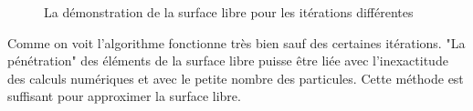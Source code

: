 \documentclass{article}
\begin{document}
\begin{figure}[H]
\begin{minipage}[h]{0.32\linewidth}
    \end{minipage}
    \hfill
    \begin{minipage}[h]{0.32\linewidth}
    \end{minipage}
    \caption{La démonstration de la surface libre pour les itérations différentes}
\end{figure}
    
Comme on voit l'algorithme fonctionne très bien sauf des certaines itérations. "La pénétration" des éléments de la surface libre puisse être liée avec l'inexactitude des calculs numériques et avec le petite nombre des particules. Cette méthode est suffisant pour approximer la surface libre. 
\end{document}

